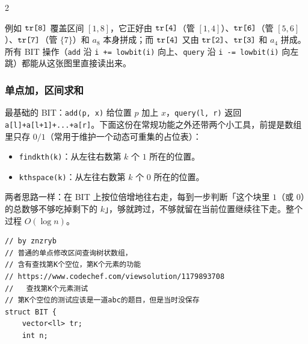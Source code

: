 \begin{multicols*}{2}
\begin{center}
		\end{center}

		例如 $\verb|tr[8]|$ 覆盖区间 $[1,8]$，它正好由 $\verb|tr[4]|$（管 $[1,4]$）、$\verb|tr[6]|$（管 $[5,6]$）、$\verb|tr[7]|$（管 $\{7\}$）和 $a_8$ 本身拼成；而 $\verb|tr[4]|$ 又由 $\verb|tr[2]|$、$\verb|tr[3]|$ 和 $a_4$ 拼成。所有 BIT 操作（\verb|add| 沿 \verb|i += lowbit(i)| 向上、\verb|query| 沿 \verb|i -= lowbit(i)| 向左跳）都能从这张图里直接读出来。

		\subsubsection{单点加，区间求和}

		最基础的 BIT：\verb|add(p, x)| 给位置 $p$ 加上 $x$，\verb|query(l, r)| 返回 \verb|a[l]+a[l+1]+...+a[r]|。下面这份在常规功能之外还带两个小工具，前提是数组里只存 $0/1$（常用于维护一个动态可重集的占位表）：

		\begin{itemize}
			\item \verb|findkth(k)|：从左往右数第 $k$ 个 $1$ 所在的位置。
			\item \verb|kthspace(k)|：从左往右数第 $k$ 个 $0$ 所在的位置。
		\end{itemize}

		两者思路一样：在 BIT 上按位倍增地往右走，每到一步判断「这个块里 $1$（或 $0$）的总数够不够吃掉剩下的 $k$」，够就跨过，不够就留在当前位置继续往下走。整个过程 $O(\log n)$。

		\begin{verbatim}
// by znzryb
// 普通的单点修改区间查询树状数组，
// 含有查找第K个空位，第K个元素的功能
// https://www.codechef.com/viewsolution/1179893708
//   查找第K个元素测试
// 第K个空位的测试应该是一道abc的题目，但是当时没保存
struct BIT {
	vector<ll> tr;
	int n;


\end{verbatim}
\end{multicols*}
